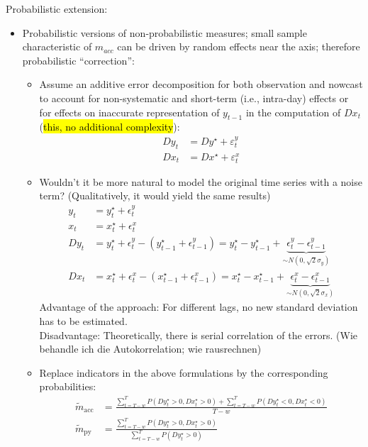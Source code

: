 \documentclass[oneside]{article}
\theoremstyle{plain}%
\theoremstyle{definition}
\newcommand{\ydiff}{D y}
\newcommand{\ydifft}{Dy^\star}
\newcommand{\xdiff}{Dx}
\newcommand{\xdifft}{Dx^\star}
\newcommand{\Prob}[1]{P(#1)}
\newcommand{\mprob}{\tilde{m}}
\begin{document}
Probabilistic extension:
\begin{itemize}
\item Probabilistic versions of non-probabilistic measures; small sample characteristic of $m_{acc}$ can be driven by random effects near the axis; therefore probabilistic \enquote{correction}:
\begin{itemize}
  \item Assume an additive error decomposition for both observation and nowcast to account for non-systematic and short-term (i.e., intra-day) effects or for effects on inaccurate representation of $y_{t-1}$ in the computation of $Dx_t$ (\hl{this, no additional complexity}):
  	\begin{align}\label{additive error decomposition}
  		\ydiff_t &= \ydifft + \varepsilon_t^y \\
  		\xdiff_t &= \xdifft + \varepsilon_t^x
	\end{align}
 \item Wouldn't it be more natural to model the original time series with a noise term? (Qualitatively, it would yield the same results)
 \begin{align}
     y_t &= y_t^\star + \epsilon_t^y \\
     x_t &= x_t^\star + \epsilon_t^x \\
     \ydiff_t &= y_t^\star + \epsilon_t^y - (y_{t-1}^\star + \epsilon_{t-1}^y) = y_t^\star - y_{t-1}^\star + \underbrace{\epsilon_t^y - \epsilon_{t-1}^y}_{\sim N(0, \sqrt{2} \sigma_y)} \\
     \xdiff_t &= x_t^\star + \epsilon_t^x - (x_{t-1}^\star + \epsilon_{t-1}^x) = x_t^\star - x_{t-1}^\star + \underbrace{\epsilon_t^x - \epsilon_{t-1}^x}_{\sim N(0, \sqrt{2} \sigma_x)}
 \end{align}
 Advantage of the approach: For different lags, no new standard deviation has to be estimated.\\
 Disadvantage: Theoretically, there is serial correlation of the errors. (Wie behandle ich die Autokorrelation; wie rausrechnen)
\item  Replace indicators in the above formulations by the corresponding probabilities:
\begin{align}
		\mprob_{\text{acc}} &= \frac{\sum_{t=T-w}^T \Prob{ \ydifft_t > 0, \xdifft_t > 0} + \sum_{t=T-w}^T \Prob{\ydifft_t < 0, \xdifft_t < 0}}{T-w}  \\
   \mprob_{\text{py}} &= \frac{\sum_{t=T-w}^T \Prob{\ydifft_t > 0, \xdifft_t > 0}}{\sum_{t=T-w}^T \Prob{\ydifft_t > 0}} \\

\end{align}
\end{itemize}
\end{itemize}
\end{document}
